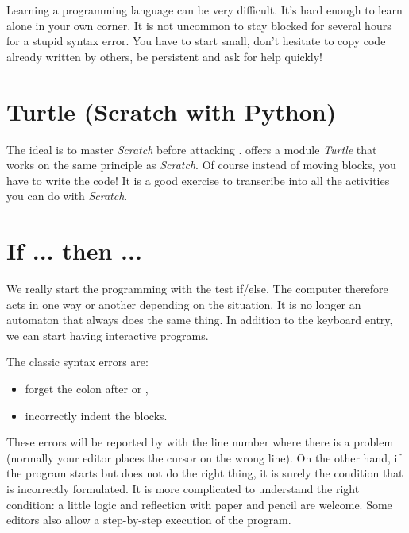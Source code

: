 \documentclass[11pt,class=report,crop=false]{standalone}
\begin{document}
Learning a programming language can be very difficult. It's hard enough to learn alone in your own corner. It is not uncommon to stay blocked for several hours for a stupid syntax error. You have to start small, don't hesitate to copy code already written by others, be persistent and ask for help quickly!


\section{Turtle (Scratch with Python)}

The ideal is to master \emph{Scratch} before attacking \Python{}.
\Python{} offers a module \emph{Turtle} that works on the same principle as  \emph{Scratch}.
Of course instead of moving blocks, you have to write the code!
It is a good exercise to transcribe into \Python{} all the activities you can do with \emph{Scratch}.


\section{If ... then ...}

We really start the programming with the test \og{}if/else\fg{}.
The computer therefore acts in one way or another depending on the situation. It is no longer an automaton that always does the same thing. In addition to the keyboard entry, we can start having interactive programs.

The classic syntax errors are:
\begin{itemize}
  \item forget the colon after  or ,
  \item incorrectly indent the blocks.
\end{itemize}
These errors will be reported by \Python{} with the line number where there is a problem (normally your editor places the cursor on the wrong line).
On the other hand, if the program starts but does not do the right thing, it is surely the condition that is incorrectly formulated. It is more complicated to understand the right condition: a little logic and reflection with paper and pencil are welcome. 
Some editors also allow a step-by-step execution of the \Python{} program.
\end{document}
